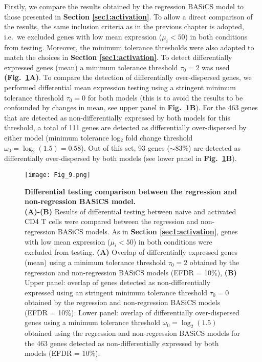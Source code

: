Firstly, we compare the results obtained by the regression BASiCS model to those presented in \textbf{Section \ref{sec1:activation}}.  
To allow a direct comparison of the results, the same inclusion criteria as in the previous chapter is adopted, i.e.~we excluded genes with low mean expression ($\mu_i<50$) in both conditions from testing. Moreover, the minimum tolerance thresholds were also adapted to match the choices in \textbf{Section \ref{sec1:activation}}. To detect differentially expressed genes (mean) a minimum tolerance threshold $\tau_0 = 2$ was used \textbf{(Fig.~\ref{fig2:model_comparison}A)}. To compare the detection of differentially over-dispersed genes, we performed differential mean expression testing using a stringent minimum tolerance threshold $\tau_0 = 0$ for both models (this is to avoid the results to be confounded by changes in mean, see upper panel in \textbf{Fig.~\ref{fig2:model_comparison}B}). For the 463 genes that are detected as non-differentially expressed by both models for this threshold, a total of 111 genes are detected as differentially over-dispersed by either model (minimum tolerance log$_2$ fold change threshold $\omega_0 = \log_2(1.5) = 0.58$). Out of this set, 93 genes ($\sim$83\%) are detected as differentially over-dispersed by both models (see lower panel in \textbf{Fig.~\ref{fig2:model_comparison}B}).

\newpage

\begin{figure}[!h]
\centering
\texttt{[image: Fig\_9.png]}
\caption[Differential testing results of the regression and non-regression BASiCS model]{\textbf{Differential testing comparison between the regression and non-regression BASiCS model.}\\
\textbf{(A)-(B)} Results of differential testing between naive and activated CD4\plus{} T cells were compared between the regression and non-regression BASiCS models. As in \textbf{Section \ref{sec1:activation}}, genes with low mean expression ($\mu_i<50$) in both conditions were excluded from testing. \textbf{(A)} Overlap of differentially expressed genes (mean) using a minimum tolerance threshold $\tau_0=2$ obtained by the regression and non-regression BASiCS models (EFDR = 10\%), \textbf{(B)} Upper panel: overlap of genes detected as non-differentially expressed using an stringent minimum tolerance threshold $\tau_0=0$ obtained by the regression and non-regression BASiCS models (EFDR = 10\%). Lower panel: overlap of differentially over-dispersed genes using a minimum tolerance threshold $\omega_0=\log_2(1.5)$ obtained using the regression and non-regression  BASiCS models for the 463 genes detected as non-differentially expressed by both models (EFDR = 10\%).}
\label{fig2:model_comparison}
\end{figure}

